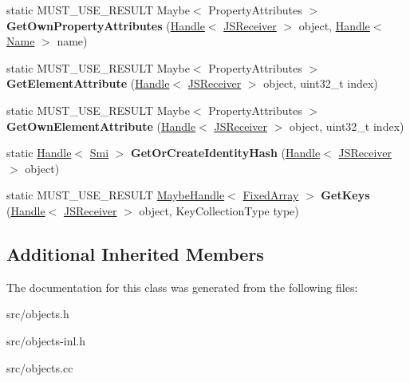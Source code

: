 \begin{DoxyCompactItemize}
\item 
\hypertarget{classv8_1_1internal_1_1_j_s_receiver_a8a04e35c5c52be5c915a6fa942c3dfa7}{}static M\+U\+S\+T\+\_\+\+U\+S\+E\+\_\+\+R\+E\+S\+U\+L\+T Maybe$<$ Property\+Attributes $>$ {\bfseries Get\+Own\+Property\+Attributes} (\hyperlink{classv8_1_1internal_1_1_handle}{Handle}$<$ \hyperlink{classv8_1_1internal_1_1_j_s_receiver}{J\+S\+Receiver} $>$ object, \hyperlink{classv8_1_1internal_1_1_handle}{Handle}$<$ \hyperlink{classv8_1_1internal_1_1_name}{Name} $>$ name)\label{classv8_1_1internal_1_1_j_s_receiver_a8a04e35c5c52be5c915a6fa942c3dfa7}

\item 
\hypertarget{classv8_1_1internal_1_1_j_s_receiver_a24b5c44b76efac05ff8104d283f2f13d}{}static M\+U\+S\+T\+\_\+\+U\+S\+E\+\_\+\+R\+E\+S\+U\+L\+T Maybe$<$ Property\+Attributes $>$ {\bfseries Get\+Element\+Attribute} (\hyperlink{classv8_1_1internal_1_1_handle}{Handle}$<$ \hyperlink{classv8_1_1internal_1_1_j_s_receiver}{J\+S\+Receiver} $>$ object, uint32\+\_\+t index)\label{classv8_1_1internal_1_1_j_s_receiver_a24b5c44b76efac05ff8104d283f2f13d}

\item 
\hypertarget{classv8_1_1internal_1_1_j_s_receiver_adeeb939a1121f336eb281e56c516d202}{}static M\+U\+S\+T\+\_\+\+U\+S\+E\+\_\+\+R\+E\+S\+U\+L\+T Maybe$<$ Property\+Attributes $>$ {\bfseries Get\+Own\+Element\+Attribute} (\hyperlink{classv8_1_1internal_1_1_handle}{Handle}$<$ \hyperlink{classv8_1_1internal_1_1_j_s_receiver}{J\+S\+Receiver} $>$ object, uint32\+\_\+t index)\label{classv8_1_1internal_1_1_j_s_receiver_adeeb939a1121f336eb281e56c516d202}

\item 
\hypertarget{classv8_1_1internal_1_1_j_s_receiver_aa1153b3cd4c5fd5a4cee82d4093d170f}{}static \hyperlink{classv8_1_1internal_1_1_handle}{Handle}$<$ \hyperlink{classv8_1_1internal_1_1_smi}{Smi} $>$ {\bfseries Get\+Or\+Create\+Identity\+Hash} (\hyperlink{classv8_1_1internal_1_1_handle}{Handle}$<$ \hyperlink{classv8_1_1internal_1_1_j_s_receiver}{J\+S\+Receiver} $>$ object)\label{classv8_1_1internal_1_1_j_s_receiver_aa1153b3cd4c5fd5a4cee82d4093d170f}

\item 
\hypertarget{classv8_1_1internal_1_1_j_s_receiver_ad8fc5c9a627829cacea7d2ecf8dc8c05}{}static M\+U\+S\+T\+\_\+\+U\+S\+E\+\_\+\+R\+E\+S\+U\+L\+T \hyperlink{classv8_1_1internal_1_1_maybe_handle}{Maybe\+Handle}$<$ \hyperlink{classv8_1_1internal_1_1_fixed_array}{Fixed\+Array} $>$ {\bfseries Get\+Keys} (\hyperlink{classv8_1_1internal_1_1_handle}{Handle}$<$ \hyperlink{classv8_1_1internal_1_1_j_s_receiver}{J\+S\+Receiver} $>$ object, Key\+Collection\+Type type)\label{classv8_1_1internal_1_1_j_s_receiver_ad8fc5c9a627829cacea7d2ecf8dc8c05}

\end{DoxyCompactItemize}
\subsection*{Additional Inherited Members}


The documentation for this class was generated from the following files\+:\begin{DoxyCompactItemize}
\item 
src/objects.\+h\item 
src/objects-\/inl.\+h\item 
src/objects.\+cc\end{DoxyCompactItemize}

